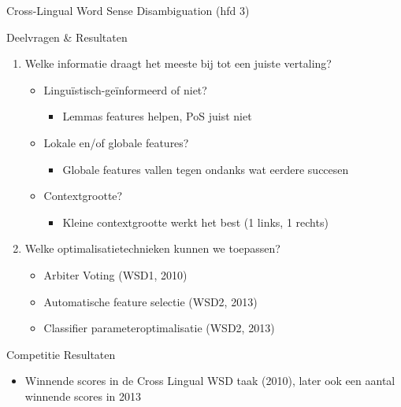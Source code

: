 \documentclass[8pt]{beamer}
\begin{document}
\begin{frame}{Cross-Lingual Word Sense Disambiguation (hfd 3)}
    \begin{block}{Deelvragen \& Resultaten}
        \begin{enumerate}
            \item Welke informatie draagt het meeste bij tot een juiste vertaling?
            \begin{itemize}
                \item \color{teal} Linguïstisch-geïnformeerd of niet?
                \begin{itemize}
                    \item \color{teal} Lemmas features helpen, PoS juist niet
                \end{itemize}
                \item Lokale en/of globale features?
                \begin{itemize}
                    \item \color{teal} Globale features vallen tegen ondanks wat eerdere succesen
                \end{itemize}
                \item Contextgrootte?
                \begin{itemize}
                    \item \color{teal} Kleine contextgrootte werkt het best (1 links, 1 rechts)
                \end{itemize}
            \end{itemize}
            \item Welke optimalisatietechnieken kunnen we toepassen?
            \begin{itemize}
                \item \color{teal} Arbiter Voting (WSD1, 2010)
                \item \color{teal} Automatische feature selectie (WSD2, 2013)
                \item \color{teal} Classifier parameteroptimalisatie (WSD2, 2013)
            \end{itemize}
        \end{enumerate}
    \end{block}
    \begin{block}{Competitie Resultaten}
        \begin{itemize}
            \item Winnende scores in de Cross Lingual WSD taak (2010), later ook een aantal winnende scores in 2013
        \end{itemize}
    \end{block}
\end{frame}
\end{document}
